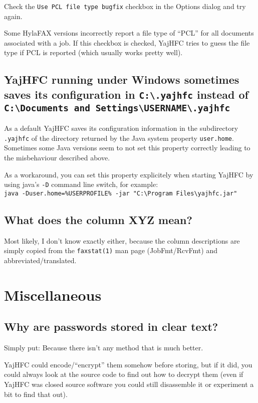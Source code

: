 \documentclass[a4paper,10pt]{scrartcl}
\begin{document}
Check the \texttt{Use PCL file type bugfix} checkbox in the Options dialog and try again.

Some HylaFAX versions incorrectly report a file type of ``PCL'' for all documents
associated with a job. If this checkbox is checked, YajHFC tries to guess the
file type if PCL is reported (which usually works pretty well).

\subsection{YajHFC running under Windows sometimes saves its configuration in \texttt{C:\textbackslash .yajhfc} instead of \texttt{C:\textbackslash Documents and Settings\textbackslash USERNAME\textbackslash .yajhfc}}

As a default YajHFC saves its configuration information in the subdirectory \texttt{.yajhfc} of the directory returned by
the Java system property \texttt{user.home}.
Sometimes some Java versions seem to not set this property correctly leading to the misbehaviour described above.

As a workaround, you can set this property explicitely when starting YajHFC by using java's \texttt{-D} command line switch, for example: \\
\texttt{java -Duser.home=\%USERPROFILE\% -jar "C:\textbackslash Program Files\textbackslash yajhfc.jar"}

\subsection{What does the column XYZ mean?}

Most likely, I don't know exactly either, because the column descriptions
are simply copied from the \verb.faxstat(1). man page (JobFmt/RcvFmt) and 
abbreviated/translated.

\section{Miscellaneous}

\subsection{Why are passwords stored in clear text?}

Simply put: Because there isn't any method that is much better.

YajHFC could encode/``encrypt'' them somehow before storing, but if it did, 
you could always look at the source code to find out how to decrypt them
(even if YajHFC was closed source software you could still disassemble it
or experiment a bit to find that out).
\end{document}
